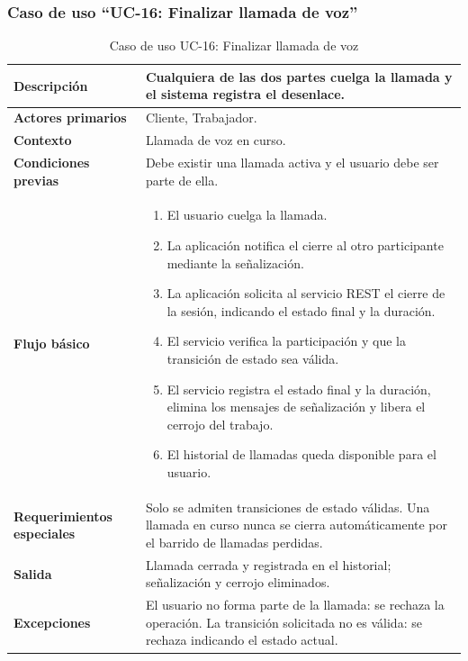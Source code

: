 \documentclass[doc,12pt,a4paper]{apa7}
\begin{document}
\subsubsection{Caso de uso ``UC-16: Finalizar llamada de voz''}

\begin{longtable}{|P{3.3cm}|L{11.2cm}|}
\caption{Caso de uso UC-16: Finalizar llamada de voz}\\
\hline
\textbf{Descripción} & Cualquiera de las dos partes cuelga la llamada y el sistema registra el desenlace. \\ \hline
\textbf{Actores primarios} & Cliente, Trabajador. \\ \hline
\textbf{Contexto} & Llamada de voz en curso. \\ \hline
\textbf{Condiciones previas} & Debe existir una llamada activa y el usuario debe ser parte de ella. \\ \hline
\textbf{Flujo básico} &
\begin{enumerate}
    \item El usuario cuelga la llamada.
    \item La aplicación notifica el cierre al otro participante mediante la señalización.
    \item La aplicación solicita al servicio REST el cierre de la sesión, indicando el estado final y la duración.
    \item El servicio verifica la participación y que la transición de estado sea válida.
    \item El servicio registra el estado final y la duración, elimina los mensajes de señalización y libera el cerrojo del trabajo.
    \item El historial de llamadas queda disponible para el usuario.
\end{enumerate} \\ \hline
\textbf{Requerimientos especiales} & Solo se admiten transiciones de estado válidas. Una llamada en curso nunca se cierra automáticamente por el barrido de llamadas perdidas. \\ \hline
\textbf{Salida} & Llamada cerrada y registrada en el historial; señalización y cerrojo eliminados. \\ \hline
\textbf{Excepciones} & El usuario no forma parte de la llamada: se rechaza la operación. La transición solicitada no es válida: se rechaza indicando el estado actual. \\ \hline
\end{longtable}
\end{document}
